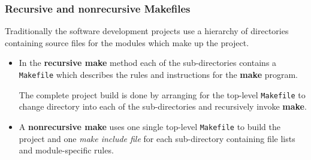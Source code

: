 \documentclass[11pt]{beamer}
\begin{document}

\begin{frame}
  \frametitle{Recursive and nonrecursive Makefiles}

  \small{
  Traditionally the software development projects use a hierarchy of
  directories containing source files for the modules which make up the
  project.
  
  \vspace{2mm}
  \begin{itemize}[<+->]
    \item In the \textbf{recursive make} method each of the sub-directories
      contains a \texttt{Makefile} which describes the rules and instructions
      for the \textbf{make} program.

      The complete project build is done by arranging for the top-level
      \texttt{Makefile} to change directory into each of the sub-directories
      and recursively invoke \textbf{make}.\\[4mm]

    \item A \textbf{nonrecursive make} uses one single top-level
      \texttt{Makefile} to build the project and one \emph{make include file}
      for each sub-directory containing file lists and module-specific rules.
  \end{itemize}
  }
\end{frame}

\end{document}
